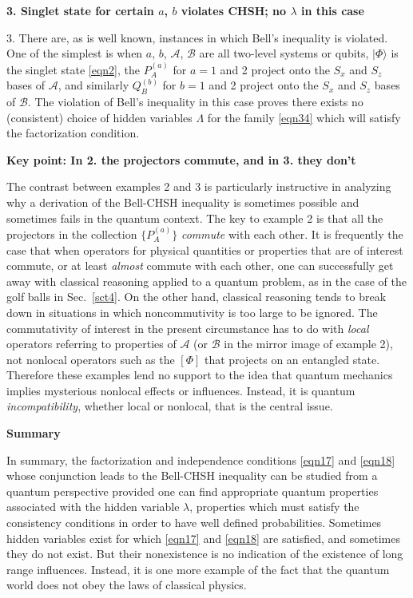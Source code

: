\documentclass[10pt]{article} %
\def\outl#1{\par{\medskip\noindent\hspace*{.5cm}\bf
      \mathversion{bold}#1\mathversion{normal}\smallskip} }
\def\np{} \def\xa{} \def\xb{} \def\xn{} \def\xp{}
\def\outl#1{} \def\np{} \def\xa{} \def\xb{} \def\xn{} \def\xp{}
\def\outl#1{\par{\medskip\noindent\hspace*{.5cm}\bf
      \mathversion{bold}#1\mathversion{normal}\smallskip} }
\def\np{\newpage }\def\xn{\nopagebreak }\def\xp{\pagebreak }
\newcommand{\ket}[1]{|#1\rgl }
\newcommand{\rgl}{\rangle }
\newcommand{\AM}{{\mathcal A}}
\newcommand{\BM}{{\mathcal B}}
\newcommand{\lm}{\lambda }
\newcommand{\Lm}{\Lambda }
\begin{document}
\xb
\outl{3. Singlet state for certain $a$, $b$ violates CHSH; no $\lm$ in this
  case} 
\xa


3. There are, as is well known, instances in which Bell's inequality is
violated.  One of the simplest is when $a$, $b$, $\AM$, $\BM$ are all
two-level systems or qubits, $\ket{\Phi}$ is the singlet state \eqref{eqn2},
the $P^{(a)}_A$ for $a=1$ and 2 project onto the $S_x$ and $S_z$ bases of
$\AM$, and similarly $Q^{(b)}_B$ for $b=1$ and 2 project onto the $S_x$ and
$S_z$ bases of $\BM$. The violation of Bell's inequality in this case proves
there exists no (consistent) choice of hidden variables $\Lm$ for the family
\eqref{eqn34} which will satisfy the factorization condition.

\xb
\outl{Key point: In 2. the projectors commute, and in 3. they don't}
\xa


The contrast between examples 2 and 3 is particularly instructive in analyzing
why a derivation of the Bell-CHSH inequality is sometimes possible and
sometimes fails in the quantum context.  The key to example 2 is that all the
projectors in the collection $\{P^{(a)}_A\}$ \emph{commute} with each other.
It is frequently the case that when operators for physical quantities or
properties that are of interest commute, or at least \emph{almost} commute
with each other, one can successfully get away with classical reasoning
applied to a quantum problem, as in the case of the golf balls in
Sec.~\ref{sct4}. On the other hand, classical reasoning tends to break down in
situations in which noncommutivity is too large to be ignored.  The
commutativity of interest in the present circumstance has to do with
\emph{local} operators referring to properties of $\AM$ (or $\BM$ in the
mirror image of example 2), not nonlocal operators such as the $[\Phi]$ that
projects on an entangled state.  Therefore these examples lend no support to
the idea that quantum mechanics implies mysterious nonlocal effects or
influences.  Instead, it is quantum \emph{incompatibility}, whether local or
nonlocal, that is the central issue.

\xb
\outl{Summary}
\xa



In summary, the factorization and independence conditions \eqref{eqn17} and
\eqref{eqn18} whose conjunction leads to the Bell-CHSH inequality can be
studied from a quantum perspective provided one can find appropriate quantum
properties associated with the hidden variable $\lm$, properties which must
satisfy the consistency conditions in order to have well defined
probabilities. Sometimes hidden variables exist for which \eqref{eqn17} and
\eqref{eqn18} are satisfied, and sometimes they do not exist.  But their
nonexistence is no indication of the existence of long range influences.
Instead, it is one more example of the fact that the quantum world does not
obey the laws of classical physics.
\end{document}
